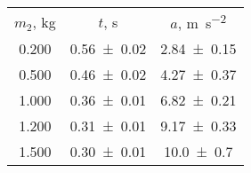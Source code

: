\begin{table}
\begin{center}
\begin{ruledtabular}
\begin{tabular}{ccc}
$m_2$, \unit{\kilo\gram} & $t$, \unit{\second} & $a$, \unit{\meter\per\second\squared} \\ 
\colrule
\num{0.200} & \num{0.56\pm0.02} & \num{2.84\pm0.15} \\ 
\num{0.500} & \num{0.46\pm0.02} & \num{4.27\pm0.37} \\ 
\num{1.000} & \num{0.36\pm0.01} & \num{6.82\pm0.21} \\ 
\num{1.200} & \num{0.31\pm0.01} & \num{9.17\pm0.33} \\ 
\num{1.500} & \num{0.30\pm0.01} & \num{10.0\pm0.7} \\ 
\end{tabular}
\end{ruledtabular}
\end{center}
\end{table}
